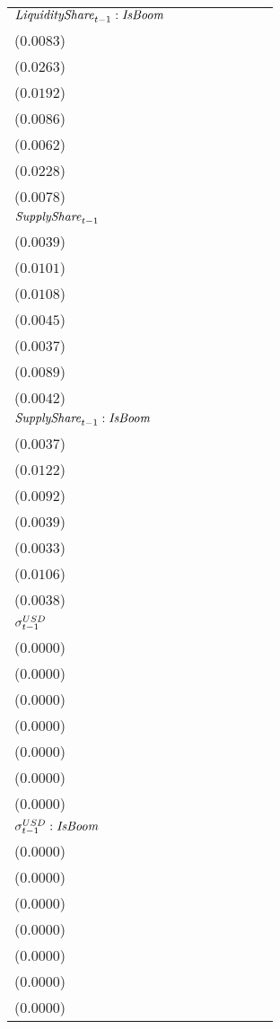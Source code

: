 \begin{tabular}{llllllll}
${\it LiquidityShare}_{t-1}:{\it IsBoom}$ & \makecell{$-0.0003^{}$ \\ ($0.0083$)} & \makecell{$0.0369^{}$ \\ ($0.0263$)} & \makecell{$0.0254^{}$ \\ ($0.0192$)} & \makecell{$0.0207^{**}$ \\ ($0.0086$)} & \makecell{$0.0112^{*}$ \\ ($0.0062$)} & \makecell{$0.0344^{}$ \\ ($0.0228$)} & \makecell{$0.0039^{}$ \\ ($0.0078$)} \\
${\it SupplyShare}_{t-1}$ & \makecell{$0.0179^{***}$ \\ ($0.0039$)} & \makecell{$0.0378^{***}$ \\ ($0.0101$)} & \makecell{$0.0457^{***}$ \\ ($0.0108$)} & \makecell{$0.0091^{**}$ \\ ($0.0045$)} & \makecell{$0.0041^{}$ \\ ($0.0037$)} & \makecell{$0.0386^{***}$ \\ ($0.0089$)} & \makecell{$0.0215^{***}$ \\ ($0.0042$)} \\
${\it SupplyShare}_{t-1}:{\it IsBoom}$ & \makecell{$-0.0059^{}$ \\ ($0.0037$)} & \makecell{$-0.0020^{}$ \\ ($0.0122$)} & \makecell{$-0.0251^{***}$ \\ ($0.0092$)} & \makecell{$-0.0034^{}$ \\ ($0.0039$)} & \makecell{$-0.0011^{}$ \\ ($0.0033$)} & \makecell{$-0.0063^{}$ \\ ($0.0106$)} & \makecell{$-0.0081^{**}$ \\ ($0.0038$)} \\
${\it \sigma}^{USD}_{t-1}$ & \makecell{$-0.0000^{}$ \\ ($0.0000$)} & \makecell{$-0.0000^{}$ \\ ($0.0000$)} & \makecell{$0.0000^{}$ \\ ($0.0000$)} & \makecell{$0.0000^{}$ \\ ($0.0000$)} & \makecell{$-0.0000^{}$ \\ ($0.0000$)} & \makecell{$-0.0000^{}$ \\ ($0.0000$)} & \makecell{$-0.0000^{}$ \\ ($0.0000$)} \\
${\it \sigma}^{USD}_{t-1}:{\it IsBoom}$ & \makecell{$0.0000^{***}$ \\ ($0.0000$)} & \makecell{$0.0000^{***}$ \\ ($0.0000$)} & \makecell{$-0.0000^{***}$ \\ ($0.0000$)} & \makecell{$-0.0000^{***}$ \\ ($0.0000$)} & \makecell{$-0.0000^{***}$ \\ ($0.0000$)} & \makecell{$0.0000^{***}$ \\ ($0.0000$)} & \makecell{$0.0000^{***}$ \\ ($0.0000$)} \\

\end{tabular}
